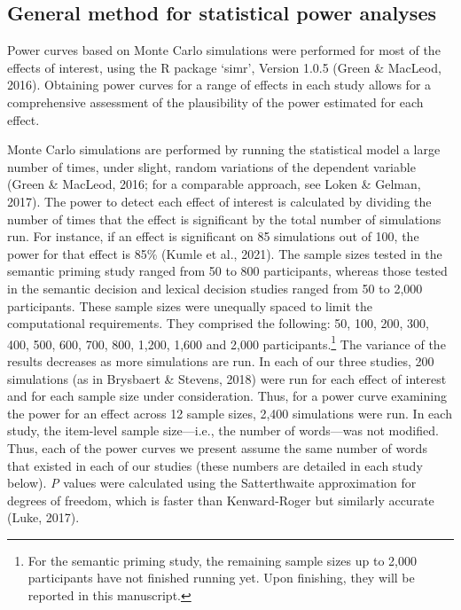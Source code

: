 \documentclass[
  12pt,
  man,floatsintext]{apa7}
\begin{document}
\hypertarget{general-method-for-statistical-power-analyses}{%
\subsection{General method for statistical power analyses}\label{general-method-for-statistical-power-analyses}}

Power curves based on Monte Carlo simulations were performed for most of the effects of interest, using the R package `simr', Version 1.0.5 (Green \& MacLeod, 2016). Obtaining power curves for a range of effects in each study allows for a comprehensive assessment of the plausibility of the power estimated for each effect.

Monte Carlo simulations are performed by running the statistical model a large number of times, under slight, random variations of the dependent variable (Green \& MacLeod, 2016; for a comparable approach, see Loken \& Gelman, 2017). The power to detect each effect of interest is calculated by dividing the number of times that the effect is significant by the total number of simulations run. For instance, if an effect is significant on 85 simulations out of 100, the power for that effect is 85\% (Kumle et al., 2021). The sample sizes tested in the semantic priming study ranged from 50 to 800 participants, whereas those tested in the semantic decision and lexical decision studies ranged from 50 to 2,000 participants. These sample sizes were unequally spaced to limit the computational requirements. They comprised the following: 50, 100, 200, 300, 400, 500, 600, 700, 800, 1,200, 1,600 and 2,000 participants.\footnote{For the semantic priming study, the remaining sample sizes up to 2,000 participants have not finished running yet. Upon finishing, they will be reported in this manuscript.} The variance of the results decreases as more simulations are run. In each of our three studies, 200 simulations (as in Brysbaert \& Stevens, 2018) were run for each effect of interest and for each sample size under consideration. Thus, for a power curve examining the power for an effect across 12 sample sizes, 2,400 simulations were run. In each study, the item-level sample size---i.e., the number of words---was not modified. Thus, each of the power curves we present assume the same number of words that existed in each of our studies (these numbers are detailed in each study below). \emph{P} values were calculated using the Satterthwaite approximation for degrees of freedom, which is faster than Kenward-Roger but similarly accurate (Luke, 2017).
\end{document}
